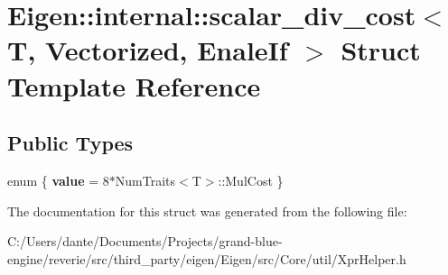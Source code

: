 \hypertarget{struct_eigen_1_1internal_1_1scalar__div__cost}{}\section{Eigen\+::internal\+::scalar\+\_\+div\+\_\+cost$<$ T, Vectorized, Enale\+If $>$ Struct Template Reference}
\label{struct_eigen_1_1internal_1_1scalar__div__cost}
\subsection*{Public Types}
\begin{DoxyCompactItemize}
\item 
\mbox{\label{struct_eigen_1_1internal_1_1scalar__div__cost_a180416bb052fef62b7859db295f6ba95}} 
enum \{ {\bfseries value} = 8$\ast$\+Num\+Traits$<$T$>$\+::Mul\+Cost
 \}
\end{DoxyCompactItemize}


The documentation for this struct was generated from the following file\+:\begin{DoxyCompactItemize}
\item 
C\+:/\+Users/dante/\+Documents/\+Projects/grand-\/blue-\/engine/reverie/src/third\+\_\+party/eigen/\+Eigen/src/\+Core/util/Xpr\+Helper.\+h\end{DoxyCompactItemize}

